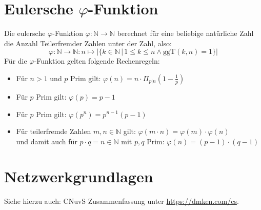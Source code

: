 \documentclass[a4paper, 11pt, accentcolor = tud3b]{tudreport}
\newcommand{\HREF}[1]{\href{#1}{#1}}
\newcommand{\ggT}{\ensuremath{\textrm{ggT}}}
\begin{document}
        \section{Eulersche \(\varphi\)-Funktion}
	        Die eulersche \(\varphi\)-Funktion \( \varphi : \mathbb{N} \rightarrow \mathbb{N} \) berechnet für eine beliebige natürliche Zahl die Anzahl Teilerfremder Zahlen unter der Zahl, also:
	        \begin{equation*}
		        \varphi : \mathbb{N} \rightarrow \mathbb{N} : n \mapsto \lvert \{ k \in \mathbb{N} \,\vert\, 1 \leq k \leq n \land \ggT(k, n) = 1 \} \rvert
	        \end{equation*}
	        Für die \(\varphi\)-Funktion gelten folgende Rechenregeln:
	        \begin{itemize}
	        	\item Für \(n > 1\) und \(p\) Prim gilt: \tabto{4.7cm} \( \varphi(n) = n \cdot \Pi_{p \vert n} (1 - \frac{1}{p}) \)
	        	\item Für \(p\) Prim gilt: \tabto{4.7cm} \( \varphi(p) = p - 1 \)
	        	\item Für \(p\) Prim gilt: \tabto{4.7cm} \( \varphi(p^n) = p^{n-1}(p-1) \)
	        	\item Für teilerfremde Zahlen \( m, n \in \mathbb{N} \) gilt: \tabto{8.2cm} \( \varphi(m \cdot n) = \varphi(m) \cdot \varphi(n) \) \\
	        	      und damit auch für \(p \cdot q = n \in \mathbb{N} \) mit \(p,q\) Prim: \tabto{8.2cm} \( \varphi(n) = (p - 1) \cdot (q - 1) \)
	        \end{itemize}

        \section{Netzwerkgrundlagen}
	        Siehe hierzu auch: CNuvS Zusammenfassung unter \HREF{https://dmken.com/cs}.
        
\end{document}
